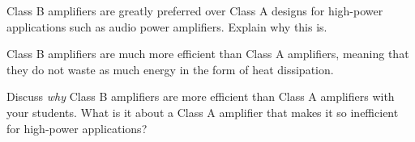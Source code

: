 

Class B amplifiers are greatly preferred over Class A designs for high-power applications such as audio power amplifiers.  Explain why this is.







Class B amplifiers are much more efficient than Class A amplifiers, meaning that they do not waste as much energy in the form of heat dissipation.







Discuss {\it why} Class B amplifiers are more efficient than Class A amplifiers with your students.  What is it about a Class A amplifier that makes it so inefficient for high-power applications?




